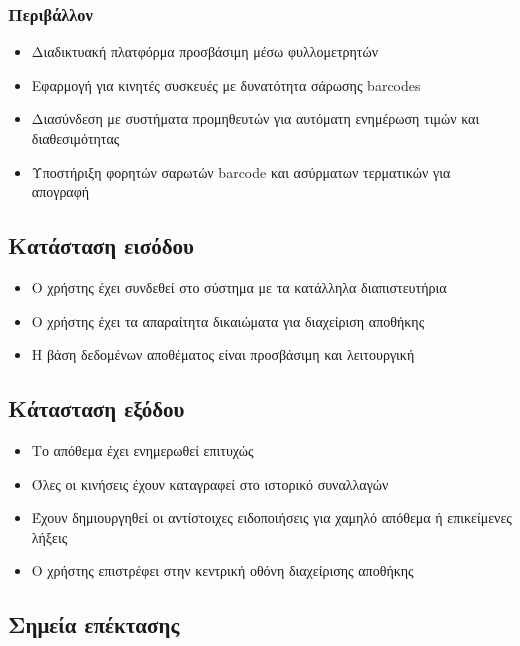 \documentclass[12pt,a4paper,twoside]{book}
\begin{document}
\subsubsection{Περιβάλλον}
\begin{itemize}
  \item Διαδικτυακή πλατφόρμα προσβάσιμη μέσω φυλλομετρητών
  \item Εφαρμογή για κινητές συσκευές με δυνατότητα σάρωσης barcodes
  \item Διασύνδεση με συστήματα προμηθευτών για αυτόματη ενημέρωση τιμών και διαθεσιμότητας
  \item Υποστήριξη φορητών σαρωτών barcode και ασύρματων τερματικών για απογραφή
\end{itemize}

\subsection{Κατάσταση εισόδου}
\begin{itemize}
  \item Ο χρήστης έχει συνδεθεί στο σύστημα με τα κατάλληλα διαπιστευτήρια
  \item Ο χρήστης έχει τα απαραίτητα δικαιώματα για διαχείριση αποθήκης
  \item Η βάση δεδομένων αποθέματος είναι προσβάσιμη και λειτουργική
\end{itemize}

\subsection{Κάτασταση εξόδου}
\begin{itemize}
  \item Το απόθεμα έχει ενημερωθεί επιτυχώς
  \item Όλες οι κινήσεις έχουν καταγραφεί στο ιστορικό συναλλαγών
  \item Έχουν δημιουργηθεί οι αντίστοιχες ειδοποιήσεις για χαμηλό απόθεμα ή επικείμενες λήξεις
  \item Ο χρήστης επιστρέφει στην κεντρική οθόνη διαχείρισης αποθήκης
\end{itemize}

\subsection{Σημεία επέκτασης}
\end{document}
